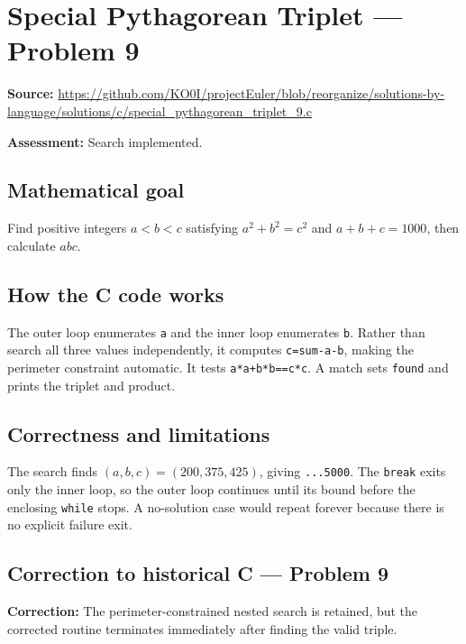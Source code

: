 \section{Special Pythagorean Triplet --- Problem 9}
\label{prob:9}
\noindent\textbf{Source:} \url{https://github.com/KO0I/projectEuler/blob/reorganize/solutions-by-language/solutions/c/special_pythagorean_triplet_9.c}

\noindent\textbf{Assessment:} Search implemented.

\subsection*{Mathematical goal}
Find positive integers \(a<b<c\) satisfying \(a^2+b^2=c^2\) and \(a+b+c=1000\), then calculate \(abc\).

\subsection*{How the C code works}
The outer loop enumerates \verb|a| and the inner loop enumerates \verb|b|. Rather than search all three values independently, it computes \verb|c=sum-a-b|, making the perimeter constraint automatic. It tests \verb|a*a+b*b==c*c|. A match sets \verb|found| and prints the triplet and product.

\subsection*{Correctness and limitations}
The search finds \((a,b,c)=(200,375,425)\), giving \texttt{...5000}. The \verb|break| exits only the inner loop, so the outer loop continues until its bound before the enclosing \verb|while| stops. A no-solution case would repeat forever because there is no explicit failure exit.


\subsection*{Correction to historical C --- Problem 9}
{\color{red}\textbf{Correction:} The perimeter-constrained nested search is retained, but the corrected routine terminates immediately after finding the valid triple.}
